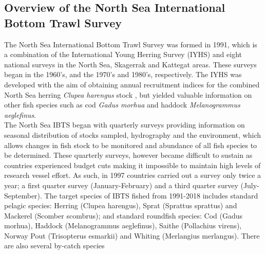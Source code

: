 \documentclass[a4paper 12pt]{article}
\numberwithin{equation}{section}
\begin{document}
\subsection{Overview of the North Sea International Bottom Trawl Survey}
\label{overview}
\indent The North Sea International Bottom Trawl Survey was formed in 1991, which is a combination of the International Young Herring Survey (IYHS) and eight national surveys in the North Sea, Skagerrak and Kattegat areas. These surveys began in the 1960's, and the 1970's and 1980's, respectively. The IYHS was developed with the aim of obtaining annual recruitment indices for the combined North Sea herring \emph{Clupea harengus} stock \citep{ICES2012}, but yielded valuable information on other fish species such as cod \emph{Gadus morhua} and haddock \emph{Melanogrammus aeglefinus}.\\
\indent The North Sea IBTS began with quarterly surveys providing information on seasonal distribution of stocks sampled, hydrography and the environment, which allows changes in fish stock to be monitored and abundance of all fish species to be determined. These quarterly surveys, however became difficult to sustain as countries experienced budget cuts making it impossible to maintain high levels of research vessel effort. As such, in 1997 countries carried out a survey only twice a year; a first quarter survey (January-February) and a third quarter survey (July-September). The target species of IBTS fished from 1991-2018 includes standard pelagic species: Herring (Clupea harengus), Sprat (Sprattus sprattus) and Mackerel (Scomber scombrus); and standard roundfish species: Cod (Gadus morhua), Haddock (Melanogrammus aeglefinus), Saithe (Pollachius virens),  Norway Pout (Trisopterus esmarkii)  and Whiting (Merlangius merlangus). There are also several by-catch species \citep[see for example,][]{ICES2006}
\end{document}
